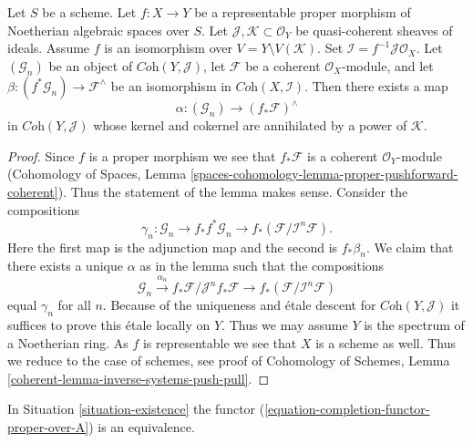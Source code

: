 \begin{lemma}
\label{lemma-inverse-systems-push-pull}
Let $S$ be a scheme. Let $f : X \to Y$ be a representable
proper morphism of Noetherian algebraic spaces over $S$. Let
$\mathcal{J}, \mathcal{K} \subset \mathcal{O}_Y$
be quasi-coherent sheaves of ideals.
Assume $f$ is an isomorphism over $V = Y \setminus V(\mathcal{K})$.
Set $\mathcal{I} = f^{-1}\mathcal{J} \mathcal{O}_X$.
Let $(\mathcal{G}_n)$ be an object of $\textit{Coh}(Y, \mathcal{J})$,
let $\mathcal{F}$ be a coherent $\mathcal{O}_X$-module, and let
$\beta : (f^*\mathcal{G}_n)  \to \mathcal{F}^\wedge$ be an isomorphism in
$\textit{Coh}(X, \mathcal{I})$. Then there exists a map
$$
\alpha :
(\mathcal{G}_n)
\longrightarrow
(f_*\mathcal{F})^\wedge
$$
in $\textit{Coh}(Y, \mathcal{J})$ whose kernel and cokernel
are annihilated by a power of $\mathcal{K}$.
\end{lemma}

\begin{proof}
Since $f$ is a proper morphism we see that $f_*\mathcal{F}$ is a coherent
$\mathcal{O}_Y$-module (Cohomology of Spaces, Lemma
\ref{spaces-cohomology-lemma-proper-pushforward-coherent}).
Thus the statement of the lemma makes sense. Consider the compositions
$$
\gamma_n : \mathcal{G}_n \to
f_*f^*\mathcal{G}_n \to
f_*(\mathcal{F}/\mathcal{I}^n\mathcal{F}).
$$
Here the first map is the adjunction map and the second is $f_*\beta_n$.
We claim that there exists a unique $\alpha$ as in the lemma
such that the compositions
$$
\mathcal{G}_n \xrightarrow{\alpha_n}
f_*\mathcal{F}/\mathcal{J}^nf_*\mathcal{F} \to
f_*(\mathcal{F}/\mathcal{I}^n\mathcal{F})
$$
equal $\gamma_n$ for all $n$. Because of the uniqueness and \'etale
descent for $\textit{Coh}(Y, \mathcal{J})$ it suffices
to prove this \'etale locally on $Y$. Thus we may assume $Y$
is the spectrum of a Noetherian ring. As $f$ is representable
we see that $X$ is a scheme as well. Thus we reduce to the case of
schemes, see proof of
Cohomology of Schemes, Lemma \ref{coherent-lemma-inverse-systems-push-pull}.
\end{proof}

\begin{theorem}
\label{theorem-grothendieck-existence}
In Situation \ref{situation-existence} the functor
(\ref{equation-completion-functor-proper-over-A})
is an equivalence.
\end{theorem}

